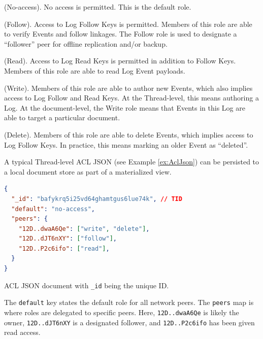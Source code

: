 \documentclass{textile}
\begin{document}
\begin{definition}
(No-access). No access is permitted. This is the default role.
\end{definition}

\begin{definition}
(Follow). Access to Log Follow Keys is permitted. Members of this role are able to verify Events and follow linkages. The Follow role is used to designate a ``follower'' peer for offline replication and/or backup.
\end{definition}

\begin{definition}
(Read). Access to Log Read Keys is permitted in addition to Follow Keys. Members of this role are able to read Log Event payloads.
\end{definition}

\begin{definition}
(Write). Members of this role are able to author new Events, which also implies access to Log Follow and Read Keys. At the Thread-level, this means authoring a Log. At the document-level, the Write role means that Events in this Log are able to target a particular document.
\end{definition}

\begin{definition}
(Delete). Members of this role are able to delete Events, which implies access to Log Follow Keys. In practice, this means marking an older Event as ``deleted''.
\end{definition}

A typical Thread-level ACL JSON (see Example \ref{ex:AclJson}) can be persisted to a local document store as part of a materialized view.

\begin{example}
\begin{minipage}{.45\textwidth}
\begin{lstlisting}[language=json,firstnumber=1]
{
  "_id": "bafykrq5i25vd64ghamtgus6lue74k", // TID
  "default": "no-access",
  "peers": {
    "12D..dwaA6Qe": ["write", "delete"],
    "12D..dJT6nXY": ["follow"],
    "12D..P2c6ifo": ["read"],
  }
}
\end{lstlisting}
\caption{ACL JSON document with \texttt{\_id} being the unique ID. }
 \label{ex:AclJson}
\end{minipage}
\end{example}

The \texttt{default} key states the default role for all network peers. The \texttt{peers} map is where roles are delegated to specific peers. Here, \texttt{12D..dwaA6Qe} is likely the owner, \texttt{12D..dJT6nXY} is a designated follower, and \texttt{12D..P2c6ifo} has been given read access.
\end{document}
